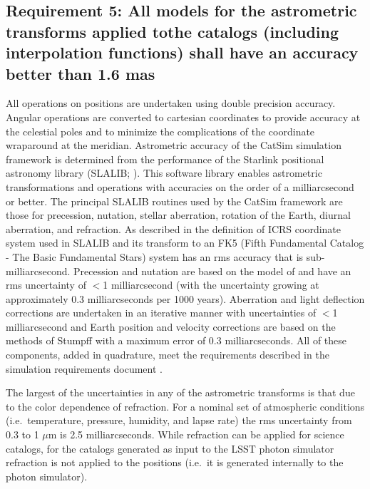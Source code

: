 \documentclass[]{article}
\begin{document}
\subsection{Requirement 5: All models for the astrometric transforms applied tothe catalogs (including interpolation functions) 
shall have an accuracy better than 1.6 mas}
All operations on positions are undertaken using double precision accuracy. Angular operations are converted to cartesian coordinates to provide accuracy at the celestial poles and to minimize the complications of the coordinate wraparound at the meridian. Astrometric accuracy of the CatSim simulation framework is determined from the performance of the Starlink positional astronomy library (SLALIB; \cite{wallace}). This software library enables astrometric transformations and operations with
accuracies on the order of a milliarcsecond or better.  The principal SLALIB routines used by the CatSim framework are those for precession, nutation, stellar aberration, rotation of the Earth, diurnal aberration, and refraction.  As described in \cite{wallace} the definition of ICRS coordinate system used in SLALIB and its transform to an FK5 (Fifth Fundamental Catalog - The Basic Fundamental Stars) system has an rms accuracy that is sub-milliarcsecond. Precession and nutation are based on the
model of \cite{SF2001} and have an rms uncertainty of $<$1 milliarcsecond (with the uncertainty growing at approximately 0.3 milliarcseconds per 1000 years). Aberration and light deflection corrections are undertaken in an iterative manner with uncertainties of $<$1 milliarcsecond and Earth position and velocity corrections are based on the methods of Stumpff \citep{stumpff} with a maximum error of 0.3 milliarcseconds. All of these components, added in quadrature, meet the requirements described
in the simulation requirements document \cite{requirements}.

The largest of the uncertainties in any of the astrometric transforms is that due to the color dependence of refraction. For a nominal set of atmospheric conditions (i.e.\ temperature, pressure, humidity, and lapse rate) the rms uncertainty from 0.3 to 1 $\mu$m is 2.5 milliarcseconds. While refraction can be applied for science catalogs, for the catalogs generated as input to the LSST photon simulator refraction is not applied to the positions (i.e.\ it is generated internally to the photon
simulator).
\end{document}
